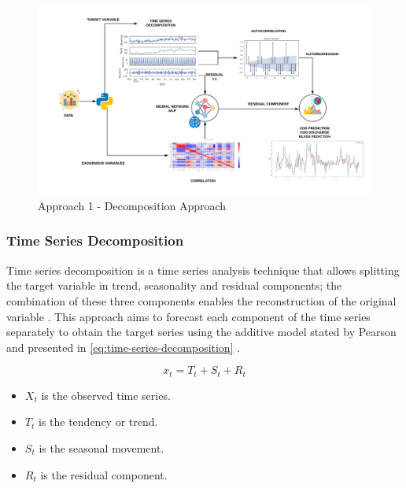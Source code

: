 \begin{figure}[h]
\centering
\includegraphics[width=\linewidth]{figures/Ch4/Approach1.pdf}
\caption{Approach 1 - Decomposition Approach}
\label{f:Approach 1}
\end{figure}

\subsubsection{Time Series Decomposition}
\label{ss:time-series-decomposition}

Time series decomposition is a time series analysis technique that allows splitting the target variable in trend, seasonality and residual components; the combination of these three components enables the reconstruction of the original variable \cite{Cryer2008}. This approach aims to forecast each component of the time series separately to obtain the target series using the additive model stated by Pearson and presented in \autoref{eq:time-series-decomposition}
\cite{dagum2010time}.

\begin{equation}\label{eq:time-series-decomposition}
    x_t = T_t + S_t + R_t
\end{equation}

\begin{itemize}
    \item \begin{math}X_t\end{math} is the observed time series.
    \item \begin{math}T_t\end{math} is the tendency or trend.
    \item \begin{math}S_t\end{math} is the seasonal movement.
    \item \begin{math}R_t\end{math} is the residual component.
\end{itemize}

